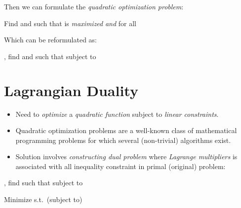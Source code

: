 \documentclass[
	number={2},
	title={Learning Linear Separators{,} SVMs and Kernels}
]{cs584notes}
\begin{document}
Then we can formulate the \emph{quadratic optimization problem}:

\begin{svmbox}
	Find  and  such that \data{\[ \rho = \frac{2}{||\vec{w}||} \]} is \emph{maximized} \emph{and} for all 
\end{svmbox}

Which can be reformulated as:

\begin{svmbox}
	, find  and  such that
	\data{\[ \mbox{\emph{Minimize }} Q(w) = \frac{1}{2}||\vec{w}||^{2} = \frac{1}{2}\vec{w}^{T}\vec{w} \]}
	subject to 
\end{svmbox}

\section{Lagrangian Duality}\label{sec:lagrangian-duality}
\begin{itemize}
	\item Need to \emph{optimize} a \emph{quadratic function} subject to \emph{linear constraints}.
	\item Quadratic optimization problems are a well-known class of mathematical programming problems for which several (non-trivial) algorithms exist.
	\item Solution involves \emph{constructing dual problem} where \emph{Lagrange multipliers}  is associated with all inequality constraint in primal (original) problem:
\end{itemize}

\begin{svmbox}
	, find  such that
	\data{\[ \mbox{\emph{Minimize} } Q(\alpha) = \sum_{i}\alpha_{i} - \frac{1}{2}\sum_{i}\sum_{j} \alpha_{i} \alpha_{j} y_{i} y_{j} \vec{x}_{i}^{T} \vec{x}_{j} \]}
	subject to 
\end{svmbox}

Minimize  s.t.\ (subject to) 
\end{document}

